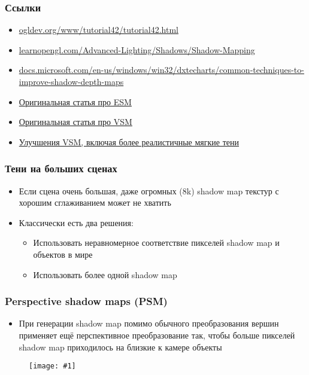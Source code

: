 \documentclass{beamer}
\newcommand{\slideimage}[1]{
  \begin{figure}
    \begin{adjustbox}{width=\textwidth, totalheight=\textheight-2\baselineskip-2\baselineskip,keepaspectratio}
      \texttt{[image: \#1]}
    \end{adjustbox}
  \end{figure}
}
\begin{document}
\begin{frame}[fragile]
\frametitle{Ссылки}
\begin{itemize}
\item \href{https://ogldev.org/www/tutorial42/tutorial42.html}{ogldev.org/www/tutorial42/tutorial42.html}
\item \href{https://learnopengl.com/Advanced-Lighting/Shadows/Shadow-Mapping}{learnopengl.com/Advanced-Lighting/Shadows/Shadow-Mapping}
\item \href{https://docs.microsoft.com/en-us/windows/win32/dxtecharts/common-techniques-to-improve-shadow-depth-maps}{docs.microsoft.com/en-us/windows/win32/dxtecharts/common-techniques-to-improve-shadow-depth-maps}
\item \href{https://jankautz.com/publications/esm_gi08.pdf}{Оригинальная статья про ESM}
\item \href{https://www.intel.com/content/dam/develop/external/us/en/documents/vsm-paper-182631.pdf}{Оригинальная статья про VSM}
\item \href{https://developer.nvidia.com/gpugems/gpugems3/part-ii-light-and-shadows/chapter-8-summed-area-variance-shadow-maps}{Улучшения VSM, включая более реалистичные мягкие тени}
\end{itemize}
\end{frame}

\begin{frame}[fragile]
\frametitle{Тени на больших сценах}
\begin{itemize}
\item Если сцена очень большая, даже огромных (8k) shadow map текстур с хорошим сглаживанием может не хватить
\pause
\item Классически есть два решения:
\begin{itemize}
\item Использовать неравномерное соответствие пикселей shadow map и объектов в мире
\item Использовать более одной shadow map
\end{itemize}
\end{itemize}
\end{frame}

\begin{frame}[fragile]
\frametitle{Perspective shadow maps (PSM)}
\begin{itemize}
\item При генерации shadow map помимо обычного преобразования вершин применяет ещё перспективное преобразование так, чтобы больше пикселей shadow map приходилось на близкие к камере объекты
\end{itemize}
\slideimage{psm.jpeg}
\end{frame}
\end{document}

